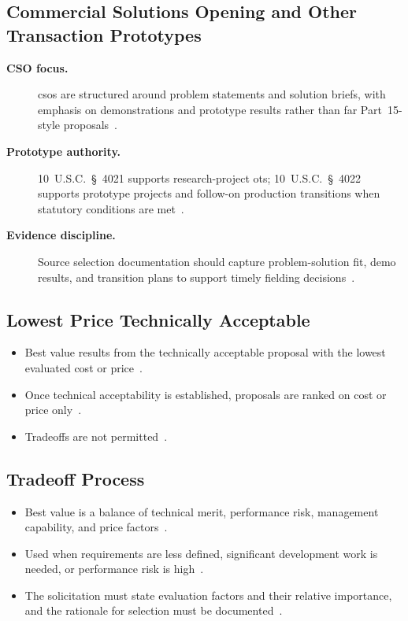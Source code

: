 \documentclass[../main.tex]{subfiles}
\begin{document}
\subsection{Commercial Solutions Opening and Other Transaction Prototypes}
\begin{description}
  \item[\textbf{CSO focus.}] \acp{cso} are structured around problem statements and solution briefs, with emphasis on demonstrations and prototype results rather than \ac{far} Part~15-style proposals~\autocite{DIU-Work-With-Us-2026,FAR-Part-15-Contracting-by-Negotiation}.
  \item[\textbf{Prototype authority.}] 10~U.S.C.\ \S~4021 supports research-project \acp{ot}; 10~U.S.C.\ \S~4022 supports prototype projects and follow-on production transitions when statutory conditions are met~\autocite{USC-4021-OTA,USC-4022-OTF}.
  \item[\textbf{Evidence discipline.}] Source selection documentation should capture problem-solution fit, demo results, and transition plans to support timely fielding decisions~\autocite{DIU-Work-With-Us-2026}.
\end{description}

\subsection{Lowest Price Technically Acceptable}
\begin{itemize}
  \item Best value results from the technically acceptable proposal with the lowest evaluated cost or price~\autocite{edo-3-2-3-source-selection-2025,FAR-15-101-2-LPTA}.
  \item Once technical acceptability is established, proposals are ranked on cost or price only~\autocite{edo-3-2-3-source-selection-2025,FAR-15-101-2-LPTA}.
  \item Tradeoffs are not permitted~\autocite{edo-3-2-3-source-selection-2025,FAR-15-101-2-LPTA}.
\end{itemize}

\subsection{Tradeoff Process}
\begin{itemize}
  \item Best value is a balance of technical merit, performance risk, management capability, and price factors~\autocite{edo-3-2-3-source-selection-2025,FAR-15-101-Best-Value,FAR-15-101-1-Tradeoff,FAR-15-304-Evaluation-Factors}.
  \item Used when requirements are less defined, significant development work is needed, or performance risk is high~\autocite{edo-3-2-3-source-selection-2025,FAR-15-101-Best-Value}.
  \item The solicitation must state evaluation factors and their relative importance, and the rationale for selection must be documented~\autocite{edo-3-2-3-source-selection-2025,FAR-15-101-1-Tradeoff,FAR-15-304-Evaluation-Factors,FAR-15-308-Source-Selection-Decision}.
\end{itemize}
\end{document}
